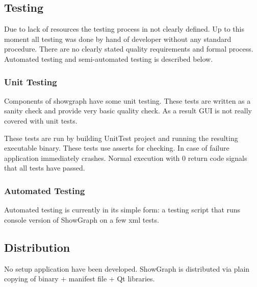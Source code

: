 \documentclass[11pt,a4paper]{article}
\begin{document}
\subsection{Testing}
Due to lack of resources the testing process in not clearly defined. Up to this moment all testing was done by hand of developer without any standard procedure. There are no clearly stated quality requirements and formal process. Automated testing and semi-automated testing is described below.

\subsubsection{Unit Testing}
Components of showgraph have some unit testing. These tests are written as a sanity check and provide very basic quality check. As a result GUI is not really covered with unit tests.

These tests are run by building UnitTest project and running the resulting executable binary. These tests use asserts for checking. In case of failure application immediately crashes. Normal execution with 0 return code signals that all tests have passed.

\subsubsection{Automated Testing}
Automated testing is currently in its simple form: a testing script that runs console version of ShowGraph on a few xml tests.

\subsection{Distribution}
No setup application have been developed. ShowGraph is distributed via plain copying of binary + manifest file + Qt libraries.
\end{document}
